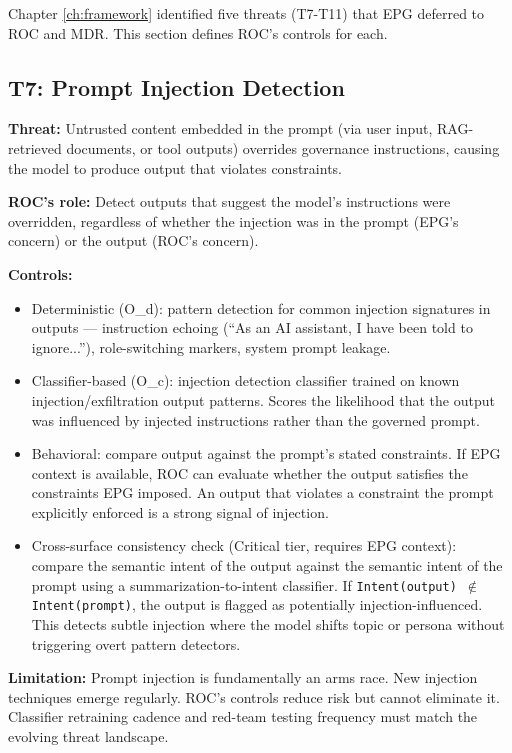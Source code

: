 Chapter \ref{ch:framework} identified five threats (T7-T11) that EPG deferred to ROC and MDR. This section defines ROC's controls for each.

\subsection{T7: Prompt Injection Detection}


\textbf{Threat:} Untrusted content embedded in the prompt (via user input, RAG-retrieved documents, or tool outputs) overrides governance instructions, causing the model to produce output that violates constraints.

\textbf{ROC's role:} Detect outputs that suggest the model's instructions were overridden, regardless of whether the injection was in the prompt (EPG's concern) or the output (ROC's concern).

\textbf{Controls:}

\begin{itemize}
  \item Deterministic (O\_\allowbreak{}d): pattern detection for common injection signatures in outputs --- instruction echoing (``As an AI assistant, I have been told to ignore...''), role-switching markers, system prompt leakage.
  \item Classifier-based (O\_\allowbreak{}c): injection detection classifier trained on known injection/exfiltration output patterns. Scores the likelihood that the output was influenced by injected instructions rather than the governed prompt.
  \item Behavioral: compare output against the prompt's stated constraints. If EPG context is available, ROC can evaluate whether the output satisfies the constraints EPG imposed. An output that violates a constraint the prompt explicitly enforced is a strong signal of injection.
  \item Cross-surface consistency check (Critical tier, requires EPG context): compare the semantic intent of the output against the semantic intent of the prompt using a summarization-to-intent classifier. If \texttt{Intent(output) $\notin$ Intent(prompt)}, the output is flagged as potentially injection-influenced. This detects subtle injection where the model shifts topic or persona without triggering overt pattern detectors.
\end{itemize}


\textbf{Limitation:} Prompt injection is fundamentally an arms race. New injection techniques emerge regularly. ROC's controls reduce risk but cannot eliminate it. Classifier retraining cadence and red-team testing frequency must match the evolving threat landscape.

